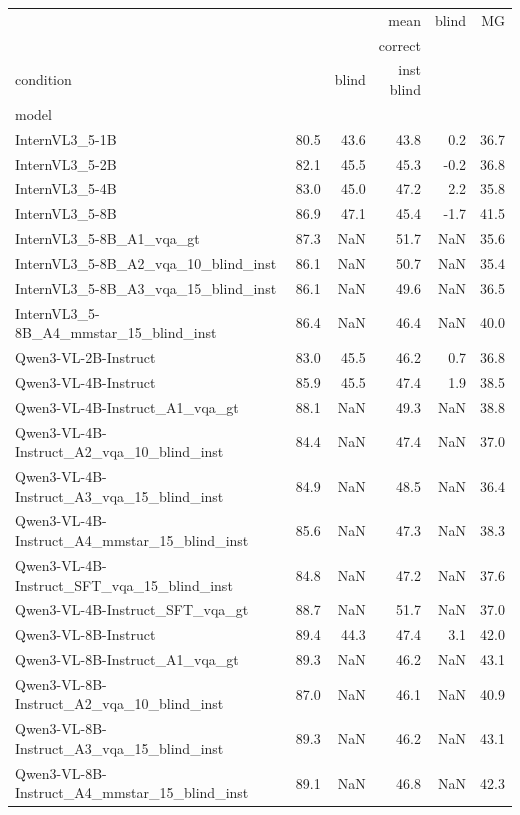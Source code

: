 \begin{tabular}{lrrrrr}
\toprule
 & \multicolumn{3}{r}{mean} & blind & MG \\
 & \multicolumn{3}{r}{correct} &  &  \\
condition &  & blind & inst blind &  &  \\
model &  &  &  &  &  \\
\midrule
InternVL3_5-1B & 80.5 & 43.6 & 43.8 & 0.2 & 36.7 \\
InternVL3_5-2B & 82.1 & 45.5 & 45.3 & -0.2 & 36.8 \\
InternVL3_5-4B & 83.0 & 45.0 & 47.2 & 2.2 & 35.8 \\
InternVL3_5-8B & 86.9 & 47.1 & 45.4 & -1.7 & 41.5 \\
InternVL3_5-8B_A1_vqa_gt & 87.3 & NaN & 51.7 & NaN & 35.6 \\
InternVL3_5-8B_A2_vqa_10_blind_inst & 86.1 & NaN & 50.7 & NaN & 35.4 \\
InternVL3_5-8B_A3_vqa_15_blind_inst & 86.1 & NaN & 49.6 & NaN & 36.5 \\
InternVL3_5-8B_A4_mmstar_15_blind_inst & 86.4 & NaN & 46.4 & NaN & 40.0 \\
Qwen3-VL-2B-Instruct & 83.0 & 45.5 & 46.2 & 0.7 & 36.8 \\
Qwen3-VL-4B-Instruct & 85.9 & 45.5 & 47.4 & 1.9 & 38.5 \\
Qwen3-VL-4B-Instruct_A1_vqa_gt & 88.1 & NaN & 49.3 & NaN & 38.8 \\
Qwen3-VL-4B-Instruct_A2_vqa_10_blind_inst & 84.4 & NaN & 47.4 & NaN & 37.0 \\
Qwen3-VL-4B-Instruct_A3_vqa_15_blind_inst & 84.9 & NaN & 48.5 & NaN & 36.4 \\
Qwen3-VL-4B-Instruct_A4_mmstar_15_blind_inst & 85.6 & NaN & 47.3 & NaN & 38.3 \\
Qwen3-VL-4B-Instruct_SFT_vqa_15_blind_inst & 84.8 & NaN & 47.2 & NaN & 37.6 \\
Qwen3-VL-4B-Instruct_SFT_vqa_gt & 88.7 & NaN & 51.7 & NaN & 37.0 \\
Qwen3-VL-8B-Instruct & 89.4 & 44.3 & 47.4 & 3.1 & 42.0 \\
Qwen3-VL-8B-Instruct_A1_vqa_gt & 89.3 & NaN & 46.2 & NaN & 43.1 \\
Qwen3-VL-8B-Instruct_A2_vqa_10_blind_inst & 87.0 & NaN & 46.1 & NaN & 40.9 \\
Qwen3-VL-8B-Instruct_A3_vqa_15_blind_inst & 89.3 & NaN & 46.2 & NaN & 43.1 \\
Qwen3-VL-8B-Instruct_A4_mmstar_15_blind_inst & 89.1 & NaN & 46.8 & NaN & 42.3 \\

\end{tabular}
